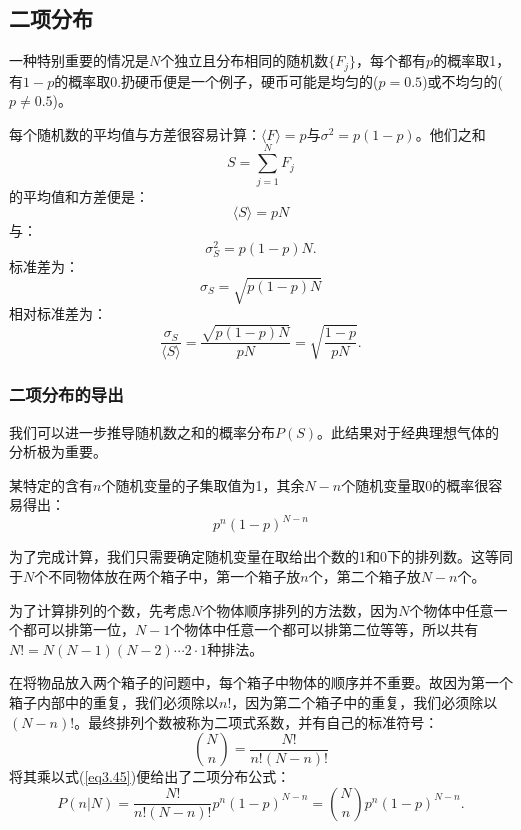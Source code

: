 \documentclass[UTF8]{ctexart}
\numberwithin{equation}{section}%
\numberwithin{figure}{section}%
\begin{document}
    \subsection{二项分布}\label{sec3.8}
    一种特别重要的情况是$N$个独立且分布相同的随机数$\{F_j\}$，每个都有$p$的概率取1，有$1-p$的概率取0.扔硬币便是一个例子，硬币可能是均匀的($p=0.5$)或不均匀的($p\neq 0.5$)。

    每个随机数的平均值与方差很容易计算：$\langle{F}\rangle=p$与$\sigma^2=p(1-p)$。他们之和
    \begin{equation}
        S=\sum^N_{j=1}F_j
    \end{equation}
    的平均值和方差便是：
    \begin{equation}\label{eq3.41}
        \langle{S}\rangle=pN
    \end{equation}
    与：
    \begin{equation}\label{eq3.42}
        \sigma_S^2=p(1-p)N.
    \end{equation}
    标准差为：
    \begin{equation}\label{eq3.43}
        \sigma_S=\sqrt{p(1-p)N}
    \end{equation}
    相对标准差为：
    \begin{equation}
        \frac{\sigma_S}{\langle{S}\rangle}=\frac{\sqrt{p(1-p)N}}{pN}=\sqrt{\frac{1-p}{pN}}.
    \end{equation}
    \subsubsection{二项分布的导出}\label{sec3.8.1}
    我们可以进一步推导随机数之和的概率分布$P(S)$。此结果对于经典理想气体的分析极为重要。

    某特定的含有$n$个随机变量的子集取值为1，其余$N-n$个随机变量取0的概率很容易得出：
    \begin{equation}\label{eq3.45}
        p^n(1-p)^{N-n}
    \end{equation}

    为了完成计算，我们只需要确定随机变量在取给出个数的1和0下的排列数。这等同于$N$个不同物体放在两个箱子中，第一个箱子放$n$个，第二个箱子放$N-n$个。

    为了计算排列的个数，先考虑$N$个物体顺序排列的方法数，因为$N$个物体中任意一个都可以排第一位，$N-1$个物体中任意一个都可以排第二位等等，所以共有$N!=N(N-1)(N-2)\cdots 2\cdot 1$种排法。

    在将物品放入两个箱子的问题中，每个箱子中物体的顺序并不重要。故因为第一个箱子内部中的重复，我们必须除以$n!$，因为第二个箱子中的重复，我们必须除以$(N-n)!$。最终排列个数被称为二项式系数，并有自己的标准符号：
    \begin{equation}\label{eq3.46}
    \binom{N}{n} = \frac{N!}{n!(N-n)!}
    \end{equation}
    将其乘以式(\ref{eq3.45})便给出了二项分布公式：
    \begin{equation}\label{eq3.47}
        P(n|N)=\frac{N!}{n!(N-n)!}p^n(1-p)^{N-n}=\binom{N}{n}p^n(1-p)^{N-n}.
    \end{equation}
\end{document}

